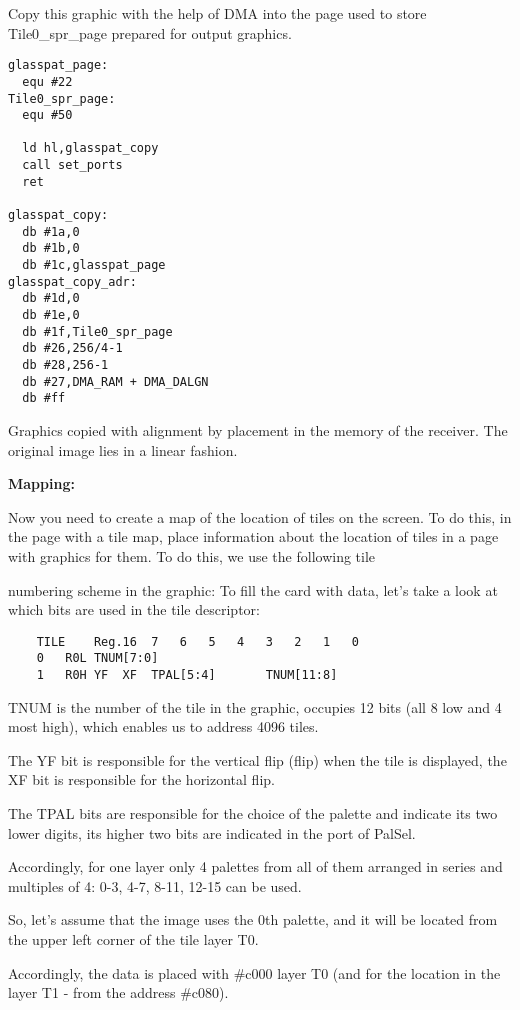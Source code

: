 \documentclass{article}
\begin{document}
Copy this graphic with the help of DMA into the page used to store
Tile0\_spr\_page prepared for output graphics.

\begin{verbatim}
glasspat_page:
  equ #22
Tile0_spr_page:
  equ #50

  ld hl,glasspat_copy
  call set_ports
  ret

glasspat_copy:
  db #1a,0
  db #1b,0
  db #1c,glasspat_page
glasspat_copy_adr:
  db #1d,0
  db #1e,0
  db #1f,Tile0_spr_page
  db #26,256/4-1
  db #28,256-1
  db #27,DMA_RAM + DMA_DALGN
  db #ff
\end{verbatim}

Graphics copied with alignment by placement in the memory of the
receiver. The original image lies in a linear fashion.

\textbf{Mapping:}

Now you need to create a map of the location of tiles on the
screen. To do this, in the page with a tile map, place information
about the location of tiles in a page with graphics for them. To do
this, we use the following tile

numbering scheme in the graphic: To fill the card with data, let's
take a look at which bits are used in the tile descriptor:

\begin{verbatim}
    TILE	Reg.16	7	6	5	4	3	2	1	0
    0	R0L	TNUM[7:0]
    1	R0H	YF	XF	TPAL[5:4]		TNUM[11:8]
\end{verbatim}

TNUM is the number of the tile in the graphic, occupies 12 bits (all 8
low and 4 most high), which enables us to address 4096 tiles.

The YF bit is responsible for the vertical flip (flip) when the tile
is displayed, the XF bit is responsible for the horizontal flip.

The TPAL bits are responsible for the choice of the palette and
indicate its two lower digits, its higher two bits are indicated in
the port of PalSel.

Accordingly, for one layer only 4 palettes from all of them arranged
in series and multiples of 4: 0-3, 4-7, 8-11, 12-15 can be used.

So, let's assume that the image uses the 0th palette, and it will be
located from the upper left corner of the tile layer T0.

Accordingly, the data is placed with \#c000 layer T0 (and for the
location in the layer T1 - from the address \#c080).
\end{document}
